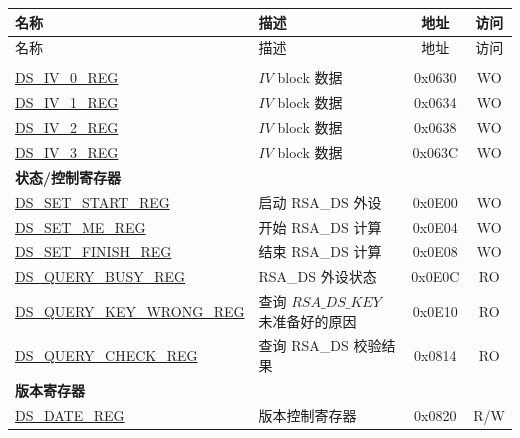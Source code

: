 


\begin{longtable}{ | p{5.2cm} | p{6.6cm} | c| c| }
\hline\rowcolor{lightgray}
名称 & 描述 &  地址 & 访问 \\ \hline
\endfirsthead
        \hline
        \rowcolor{lightgray}
名称 & 描述 &  地址 & 访问 \\ \hline

        \endhead
        \endfoot
\multicolumn{4}{|l|}{\textbf{配置寄存器}} \\ \hline
\hyperref[regdesc:DSIVREG]{DS\_IV\_0\_REG}               & \begin{math}IV\end{math} block 数据         & 0x0630 & WO \\ \hline
\hyperref[regdesc:DSIVREG]{DS\_IV\_1\_REG}               & \begin{math}IV\end{math} block 数据          & 0x0634 & WO \\ \hline
\hyperref[regdesc:DSIVREG]{DS\_IV\_2\_REG}               & \begin{math}IV\end{math} block 数据          & 0x0638 & WO \\ \hline
\hyperref[regdesc:DSIVREG]{DS\_IV\_3\_REG}               & \begin{math}IV\end{math} block 数据           & 0x063C & WO \\ \hline
\multicolumn{4}{|l|}{\textbf{状态/控制寄存器}} \\ \hline
\hyperref[regdesc:DSSETSTARTREG]{DS\_SET\_START\_REG}               & 启动 RSA\_DS 外设     & 0x0E00 & WO \\ \hline
\hyperref[regdesc:DSSETMEREG]{DS\_SET\_ME\_REG}                     & 开始 RSA\_DS 计算       & 0x0E04 & WO \\ \hline
\hyperref[regdesc:DSSETFINISHREG]{DS\_SET\_FINISH\_REG}             & 结束 RSA\_DS 计算         & 0x0E08 & WO \\ \hline
\hyperref[regdesc:DSQUERYBUSYREG]{DS\_QUERY\_BUSY\_REG}             & RSA\_DS 外设状态& 0x0E0C & RO \\ \hline
\hyperref[regdesc:DSQUERYKEYWRONGREG]{DS\_QUERY\_KEY\_WRONG\_REG}   & 查询 \begin{math}RSA\_DS\_KEY\end{math} 未准备好的原因       & 0x0E10 & RO \\ \hline
\hyperref[regdesc:DSQUERYCHECKREG]{DS\_QUERY\_CHECK\_REG}           & 查询 RSA\_DS 校验结果    & 0x0814 & RO \\ \hline
\multicolumn{4}{|l|}{\textbf{版本寄存器}} \\ \hline
\hyperref[regdesc:DSDATEREG]{DS\_DATE\_REG}                   & 版本控制寄存器   & 0x0820 & R/W \\ \hline
\end{longtable}

